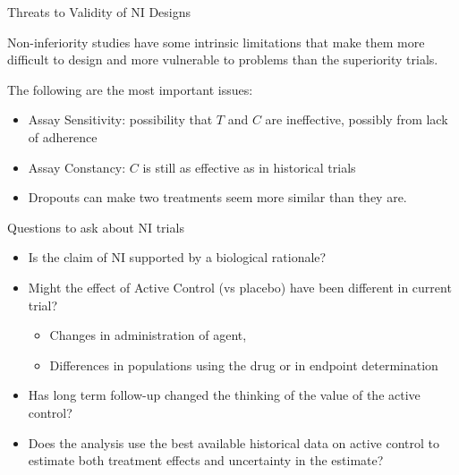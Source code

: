 \documentclass[ignorenonframetext,]{beamer}
\providecommand{\tightlist}{%
  \setlength{\itemsep}{0pt}\setlength{\parskip}{0pt}}
\begin{document}
\begin{frame}{Threats to Validity of NI Designs}
\protect\hypertarget{threats-to-validity-of-ni-designs}{}

Non-inferiority studies have some intrinsic limitations that make them
more difficult to design and more vulnerable to problems than the
superiority trials. \medskip

The following are the most important issues:

\begin{itemize}
\item
  Assay Sensitivity: possibility that \(T\) and \(C\) are ineffective,
  possibly from lack of adherence
\item
  Assay Constancy: \(C\) is still as effective as in historical trials
\item
  Dropouts can make two treatments seem more similar than they are.
\end{itemize}

\end{frame}

\begin{frame}{Questions to ask about NI trials}
\protect\hypertarget{questions-to-ask-about-ni-trials}{}

\begin{itemize}
\item
  Is the claim of NI supported by a biological rationale?
\item
  Might the effect of Active Control (vs placebo) have been different in
  current trial?

  \begin{itemize}
  \tightlist
  \item
    Changes in administration of agent,\\
  \item
    Differences in populations using the drug or in endpoint
    determination
  \end{itemize}
\item
  Has long term follow-up changed the thinking of the value of the
  active control?
\item
  Does the analysis use the best available historical data on active
  control to estimate both treatment effects and uncertainty in the
  estimate?
\end{itemize}

\end{frame}
\end{document}
